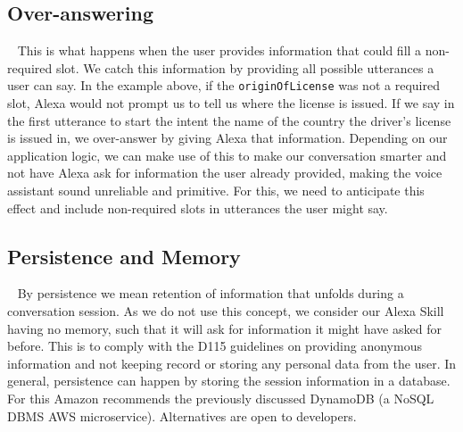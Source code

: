 	
	
	
	
		
	\subsection*{Over-answering}~\label{overanswering:def}
	This is what happens when the user provides information that could fill a non-required slot.
	We catch this information by providing all possible utterances a user can say. 
	In the example above, if the  \texttt{originOfLicense} was not a required slot, Alexa would not prompt us to tell us where the license is issued. If we say in the first utterance to start the intent the name of the country the driver's license is issued in, we over-answer by giving Alexa that information. Depending on our application logic, we can make use of this to make our conversation smarter and not have Alexa ask for information the user already provided, making the voice assistant sound unreliable and primitive. For this, we need to anticipate this effect and include non-required slots in utterances the user might say.

	\subsection*{Persistence and Memory}~\label{memory:def}
	By persistence we mean retention of information that unfolds during a conversation session. As we do not use this concept, we consider our Alexa Skill having no memory, such that it will ask for information it might have asked for before. This is to comply with the D115 guidelines on providing anonymous information and not keeping record or storing any personal data from the user. In general, persistence can happen by storing the session information in a database. For this Amazon recommends the previously discussed DynamoDB (a NoSQL DBMS AWS microservice). Alternatives are open to developers.\\

%	

